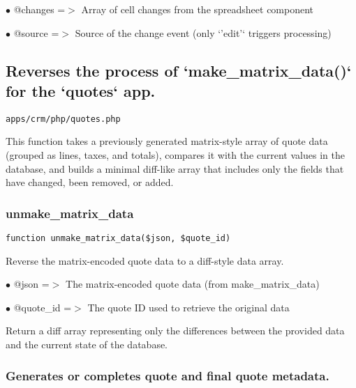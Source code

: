 \documentclass[a4paper]{article}
\begin{document}
\begin{compactitem}
\item[\color{myblue}$\bullet$] @changes =$>$ Array of cell changes from the spreadsheet component
\item[\color{myblue}$\bullet$] @source  =$>$ Source of the change event (only `'edit'` triggers processing)
\end{compactitem}

\hypertarget{toc48}{}
\subsection{Reverses the process of `make\_matrix\_data()` for the `quotes` app.}

\begin{lstlisting}
apps/crm/php/quotes.php
\end{lstlisting}

This function takes a previously generated matrix-style array of quote data
(grouped as lines, taxes, and totals), compares it with the current values
in the database, and builds a minimal diff-like array that includes only
the fields that have changed, been removed, or added.

\hypertarget{toc49}{}
\subsubsection{unmake\_matrix\_data}

\begin{lstlisting}
function unmake_matrix_data($json, $quote_id)
\end{lstlisting}

Reverse the matrix-encoded quote data to a diff-style data array.

\begin{compactitem}
\item[\color{myblue}$\bullet$] @json     =$>$ The matrix-encoded quote data (from make\_matrix\_data)
\item[\color{myblue}$\bullet$] @quote\_id =$>$ The quote ID used to retrieve the original data
\end{compactitem}

Return a diff array representing only the differences between the provided
data and the current state of the database.

\hypertarget{toc50}{}
\subsubsection{Generates or completes quote and final quote metadata.}
\end{document}
